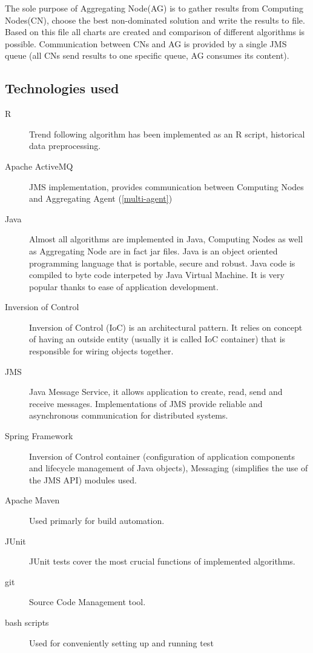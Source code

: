 The sole purpose of Aggregating Node(AG) is to gather results from Computing Nodes(CN), choose the best non-dominated solution and write the results to file. 
Based on this file all charts are created and comparison of different algorithms is possible.
Communication between CNs and AG is provided by a single JMS queue (all CNs send results to one specific queue, AG consumes its content).


\subsection{Technologies used}

\begin{description}
  \item [R]
      Trend following algorithm has been implemented as an R script, historical data preprocessing.
  \item [Apache ActiveMQ]
      JMS implementation, provides communication between Computing Nodes and Aggregating Agent (\ref{multi-agent})
  \item [Java]
      Almost all algorithms are implemented in Java, Computing Nodes as well as Aggregating Node are in fact jar files.
      Java is an object oriented programming language that is portable, secure and robust.
      Java code is compiled to byte code interpeted by Java Virtual Machine. 
      It is very popular thanks to ease of application development. 
  \item [Inversion of Control]
	Inversion of Control (IoC) is an architectural pattern.
	It relies on concept of having an outside entity (usually it is called IoC container) that is responsible for wiring objects together. \cite{Spring} 
  \item [JMS]
	Java Message Service, it allows application to create, read, send and receive messages.
	Implementations of JMS provide reliable and asynchronous communication for distributed systems. 

  \item [Spring Framework]
      Inversion of Control container (configuration of application components and lifecycle management of Java objects), Messaging (simplifies the use of the JMS API) modules used.
  \item [Apache Maven]
      Used primarly for build automation.
  \item [JUnit]
      JUnit tests cover the most crucial functions of implemented algorithms.
  \item [git]
      Source Code Management tool.
  \item [bash scripts]
      Used for conveniently setting up and running test 
\end{description}

 
